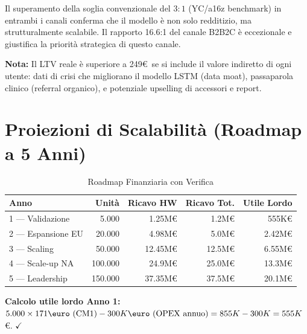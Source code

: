 \documentclass[12pt,a4paper]{article}
\begin{document}
Il superamento della soglia convenzionale del $3:1$ (YC/a16z benchmark) in entrambi i canali conferma che il modello è non solo redditizio, ma strutturalmente scalabile. Il rapporto 16.6:1 del canale B2B2C è eccezionale e giustifica la priorità strategica di questo canale.

\textbf{Nota:} Il LTV reale è superiore a 249\euro\ se si include il valore indiretto di ogni utente: dati di crisi che migliorano il modello LSTM (data moat), passaparola clinico (referral organico), e potenziale upselling di accessori e report.

\section{Proiezioni di Scalabilità (Roadmap a 5 Anni)}

\begin{table}[h!]
    \centering
    \small
    \caption{Roadmap Finanziaria con Verifica}
    \vspace{0.3cm}
    \begin{tabularx}{\textwidth}{@{}l r r r r@{}}
        \toprule
        \textbf{Anno} & \textbf{Unità} & \textbf{Ricavo HW} & \textbf{Ricavo Tot.} & \textbf{Utile Lordo} \\ \midrule
        1 --- Validazione & 5.000 & 1.25M\euro & 1.2M\euro & 555K\euro \\
        2 --- Espansione EU & 20.000 & 4.98M\euro & 5.0M\euro & 2.42M\euro \\
        3 --- Scaling & 50.000 & 12.45M\euro & 12.5M\euro & 6.55M\euro \\
        4 --- Scale-up NA & 100.000 & 24.9M\euro & 25.0M\euro & 13.3M\euro \\
        5 --- Leadership & 150.000 & 37.35M\euro & 37.5M\euro & 20.1M\euro \\
        \bottomrule
    \end{tabularx}
\end{table}

\textbf{Calcolo utile lordo Anno 1:} $5.000 \times 171\text{\euro (CM1)} - 300K\text{\euro (OPEX annuo)} = 855K - 300K = 555K$\euro. $\checkmark$
\end{document}
